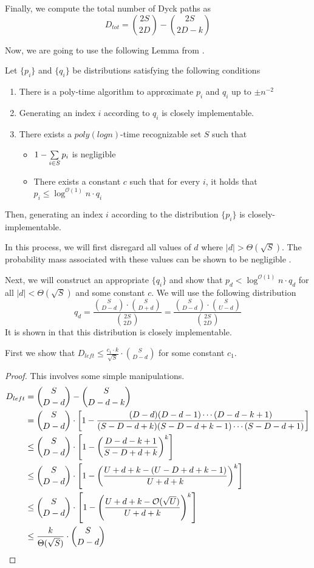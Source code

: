 Finally, we compute the total number of Dyck paths as
$$
D_{tot} = {{2S}\choose{2D}}-{{2S}\choose{2D-k}}
$$

Now, we are going to use the following Lemma from \cite{huge}.
\begin{lemma}
\label{lem:huge}
Let $\{p_i\}$ and $\{q_i\}$ be distributions satisfying the following conditions
\begin{enumerate}
    \item There is a poly-time algorithm to approximate $p_i$ and $q_i$ up to $\pm n^{-2}$
    \item Generating an index $i$ according to $q_i$ is closely implementable.
    \item There exists a $poly(log n)$-time recognizable set $S$ such that
    \begin{itemize}
        \item $1-\sum\limits_{i\in S}^{} p_i$ is negligible
        \item There exists a constant $c$ such that for every $i$, it holds that $p_i\le \log^{\mathcal{O}(1)} n\cdot q_i$
    \end{itemize}
\end{enumerate}
Then, generating an index $i$ according to the distribution $\{p_i\}$ is closely-implementable.
\end{lemma}

In this process, we will first disregard all values of $d$ where $|d|>\Theta(\sqrt S)$.
The probability mass associated with these values can be shown to be negligible .

Next, we will construct an appropriate $\{q_i\}$ and show that $p_d < \log^{\mathcal{O}(1)} n\cdot q_d$
for all $|d|<\Theta(\sqrt S)$ and some constant $c$.
We will use the following distribution
$$
q_d = \frac{{S\choose D-d}\cdot{S\choose D+d}}{{2S\choose 2D}} = \frac{{S\choose D-d}\cdot{S\choose U-d}}{{2S\choose 2D}}
$$
It is shown in \cite{huge} that this distribution is closely implementable.

\begin{lemma}
First we show that $D_{left} \le \frac{c_1\cdot k}{\sqrt{S}}\cdot{{S}\choose{D-d}}$ for some constant $c_1$.
\end{lemma}
\begin{proof}
This involves some simple manipulations.
\begin{align}
D_{left} &= {{S}\choose{D-d}}-{{S}\choose{D-d-k}}\\
&= {{S}\choose{D-d}}\cdot \left[1-\frac{(D-d)(D-d-1)\cdots(D-d-k+1)}{(S-D-d+k)(S-D-d+k-1)\cdots(S-D-d+1)}\right]\\
&\le {{S}\choose{D-d}}\cdot \left[1-\left(\frac{D-d-k+1}{S-D+d+k}\right)^k\right]\\
&\le {{S}\choose{D-d}}\cdot \left[1-\left(\frac{U+d+k-(U-D+d+k-1)}{U+d+k}\right)^k\right]\\
&\le {{S}\choose{D-d}}\cdot \left[1-\left(\frac{U+d+k-\Bo(\sqrt{U})}{U+d+k}\right)^k\right]\\
&\le \frac{k}{\Theta(\sqrt{S})}\cdot{{S}\choose{D-d}}
\end{align}
\end{proof}

